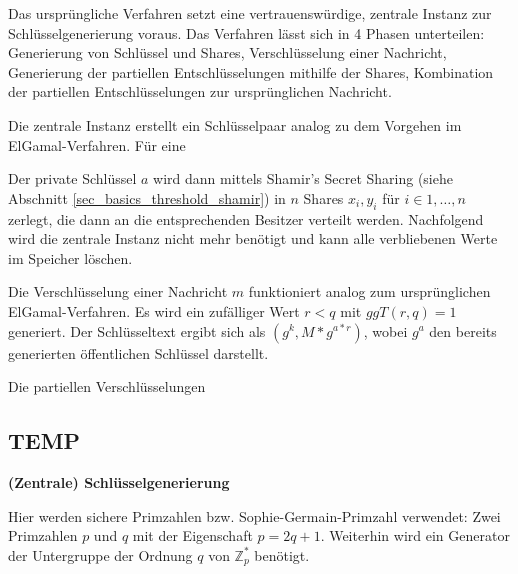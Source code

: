 Das ursprüngliche Verfahren setzt eine vertrauenswürdige, zentrale Instanz zur Schlüsselgenerierung voraus. Das Verfahren lässt sich in 4 Phasen unterteilen: Generierung von Schlüssel und Shares, Verschlüsselung einer Nachricht, Generierung der partiellen Entschlüsselungen mithilfe der Shares, Kombination der partiellen Entschlüsselungen zur ursprünglichen Nachricht. 


Die zentrale Instanz erstellt ein Schlüsselpaar analog zu dem Vorgehen im ElGamal-Verfahren. Für eine 

Der private Schlüssel \(a\) wird dann mittels Shamir's Secret Sharing (siehe Abschnitt \ref{sec_basics_threshold_shamir}) in \(n\) Shares \(x_i, y_i\) für \(i \in {1, \dots, n}\) zerlegt, die dann an die entsprechenden Besitzer verteilt werden. Nachfolgend wird die zentrale Instanz nicht mehr benötigt und kann alle verbliebenen Werte im Speicher löschen.


Die Verschlüsselung einer Nachricht \(m\) funktioniert analog zum ursprünglichen ElGamal-Verfahren. Es wird ein zufälliger Wert \(r < q\) mit \(ggT(r,q) = 1\) generiert. Der Schlüsseltext ergibt sich als \((g^k, M * g^{a*r})\), wobei \(g^a\) den bereits generierten öffentlichen Schlüssel darstellt.


Die partiellen Verschlüsselungen 





\subsection{TEMP}



\textbf{(Zentrale) Schlüsselgenerierung }

Hier werden sichere Primzahlen bzw. Sophie-Germain-Primzahl verwendet: Zwei Primzahlen \(p\) und \(q\) mit der Eigenschaft \(p = 2q + 1\). 
Weiterhin wird ein Generator der Untergruppe der Ordnung \(q\) von \(\mathbb{Z}_p^*\) benötigt.

